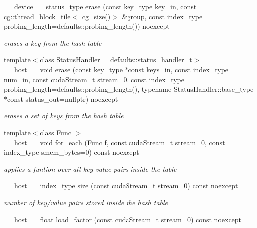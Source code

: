 \begin{DoxyCompactItemize}
\+\_\+\+\_\+device\+\_\+\+\_\+ \hyperlink{classwarpcore_1_1Status}{status\+\_\+type} \hyperlink{classwarpcore_1_1SingleValueHashTable_ae11f0157566aced6f9370b36c4c2b433}{erase} (const key\+\_\+type key\+\_\+in, const cg\+::thread\+\_\+block\+\_\+tile$<$ \hyperlink{classwarpcore_1_1SingleValueHashTable_aaa4cf7e3252a0b177101fca437e5309e}{cg\+\_\+size}()$>$ \&group, const index\+\_\+type probing\+\_\+length=defaults\+::probing\+\_\+length()) noexcept
\begin{DoxyCompactList}\small\item\em erases a key from the hash table \end{DoxyCompactList}\item 
{\footnotesize template$<$class Status\+Handler  = defaults\+::status\+\_\+handler\+\_\+t$>$ }\\\+\_\+\+\_\+host\+\_\+\+\_\+ void \hyperlink{classwarpcore_1_1SingleValueHashTable_acc24401e57d7b45ce5a75e3971948137}{erase} (const key\+\_\+type $\ast$const keys\+\_\+in, const index\+\_\+type num\+\_\+in, const cuda\+Stream\+\_\+t stream=0, const index\+\_\+type probing\+\_\+length=defaults\+::probing\+\_\+length(), typename Status\+Handler\+::base\+\_\+type $\ast$const status\+\_\+out=nullptr) noexcept
\begin{DoxyCompactList}\small\item\em erases a set of keys from the hash table \end{DoxyCompactList}\item 
{\footnotesize template$<$class Func $>$ }\\\+\_\+\+\_\+host\+\_\+\+\_\+ void \hyperlink{classwarpcore_1_1SingleValueHashTable_af903231452e4ff74cb250331175d2d17}{for\+\_\+each} (Func f, const cuda\+Stream\+\_\+t stream=0, const index\+\_\+type smem\+\_\+bytes=0) const noexcept
\begin{DoxyCompactList}\small\item\em applies a funtion over all key value pairs inside the table \end{DoxyCompactList}\item 
\+\_\+\+\_\+host\+\_\+\+\_\+ index\+\_\+type \hyperlink{classwarpcore_1_1SingleValueHashTable_a6c0e8d90665fe1eb9accf10256b57f28}{size} (const cuda\+Stream\+\_\+t stream=0) const noexcept
\begin{DoxyCompactList}\small\item\em number of key/value pairs stored inside the hash table \end{DoxyCompactList}\item 
\+\_\+\+\_\+host\+\_\+\+\_\+ float \hyperlink{classwarpcore_1_1SingleValueHashTable_ad16e25026a5ac0b064249d520299c086}{load\+\_\+factor} (const cuda\+Stream\+\_\+t stream=0) const noexcept

\end{DoxyCompactItemize}
